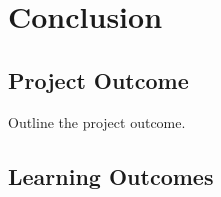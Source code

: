 \documentclass{4thYearProject}
\begin{document}
\chapter{Conclusion}

\section{Project Outcome}

Outline the project outcome. 

\section{Learning Outcomes}







\begin{appendices}
\end{appendices}
\end{document}
